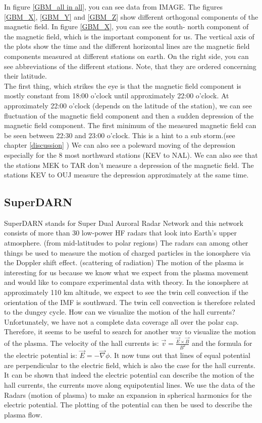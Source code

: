 \documentclass[10pt,a4paper]{article}
\begin{document}
In figure \ref{GBM_all in all}, you can see data from IMAGE. The figures \ref{GBM_X}, \ref{GBM_Y} and \ref{GBM_Z} show different orthogonal components of the magnetic 
field. In figure \ref{GBM_X}, you can see the south- north component of the magnetic field, which is the important component for us. The vertical axis of the plots 
show the time and the different horizontal lines are the magnetic field components measured at different stations on earth. On the right side, you can see abbreviations of the different stations. Note, that they are ordered concerning their latitude. \\
The first thing, which strikes the eye is that the magnetic field component is mostly constant from 18:00 o'clock until approximately 22:00 o'clock. At approximately 22:00 o'clock (depends on the latitude of the station), we can see fluctuation of the magnetic field component and then a sudden depression of the magnetic field component. The first minimum of the measured magnetic field can be seen between 22:30 and 23:00 o'clock.
This is a hint to a sub storm.(see chapter \ref{discussion} ) We can also see a poleward moving of the depression especially for the 8 most northward stations (KEV to NAL). We can also see that the stations MEK to TAR don't measure a depression of the magnetic field. The stations KEV to OUJ measure the depression approximately at the same time. 


\subsection{SuperDARN \label{0_CHAPTER_SUPERDARN}}
SuperDARN stands for  Super Dual Auroral Radar Network and this network consists of more than 30 low-power HF radars that look into Earth's upper atmosphere. 
(from mid-latitudes to polar regions) The radars can among other things be used to measure the motion of charged particles in the ionosphere via the Doppler shift effect. 
(scattering of radiation) The motion of the plasma is interesting for us because we know what we expect from the plasma movement and would like to compare experimental data 
with theory. In the ionosphere at approximately 110 km altitude, we expect to see the twin cell convection if the orientation of the IMF is southward. The twin cell convection is therefore related to the dungey cycle. 
How can we visualize the motion of the hall currents? Unfortunately, we have not a complete data coverage all over the polar cap. Therefore, it seems to be useful 
to search for another way to visualize the motion of the plasma. The velocity of the hall currents is: $\vec{v}=\frac{\vec{E}\times \vec{B}}{B^2}$ and the formula for 
the electric potential is: $\vec{E}=-\vec{\nabla} \phi$. It now tuns out that lines of equal potential are perpendicular to the electric field, which is also the case 
for the hall currents. It can be shown that indeed the electric potential can describe the motion of the hall currents, the currents move along equipotential lines. 
We use the data of the Radars (motion of plasma) to make an expansion in spherical harmonics for the electric potential. The plotting of the potential can then be used 
to describe the plasma flow. 
\end{document}
